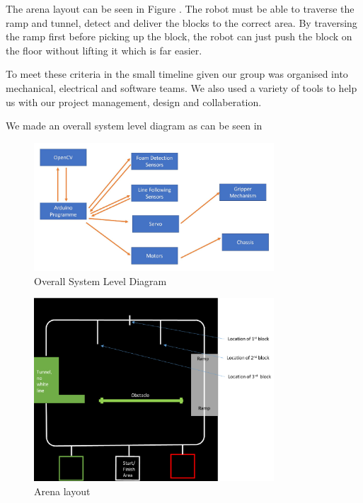 \documentclass{article}
\begin{document}
\quad The arena layout can be seen in Figure . The robot must be able to traverse the ramp and tunnel, detect and deliver the blocks to the correct area. By traversing the ramp first before picking up the block, the robot can just push the block on the floor without lifting it which is far easier.

\quad To meet these criteria in the small timeline given our group was organised into mechanical, electrical and software teams. We also used a variety of tools to help us with our project management, design and collaberation.

\quad We made an overall system level diagram as can be seen in 

\begin{figure}[!h]
    \centering
    \includegraphics[width=0.8\textwidth]{assets/Overall_sys.jpg}
    \caption{Overall System Level Diagram}
    \label{fig:overall_sys}
\end{figure}

\begin{figure}[!h]
    \centering
    \includegraphics[width=0.8\textwidth]{assets/arena.png}
    \caption{Arena layout}
    \label{fig:arena}
\end{figure}
\end{document}

